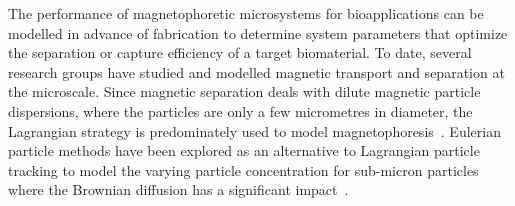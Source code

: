 
The performance of magnetophoretic microsystems for bioapplications can be modelled in advance of fabrication to determine system parameters that optimize the separation or capture efficiency of a target biomaterial. To date, several research groups have studied and
modelled magnetic transport and separation at the microscale. Since magnetic separation deals with dilute magnetic particle dispersions, where the particles are only a few micrometres in diameter, the Lagrangian strategy is predominately used to model magnetophoresis~\cite{Peyman2008,Lehmann2006}. Eulerian particle methods have been explored as an alternative to Lagrangian particle tracking to model the varying particle concentration for sub-micron particles where the Brownian diffusion has a significant impact~\cite{Vie2013,Laurent2013,Masi2014}. 

